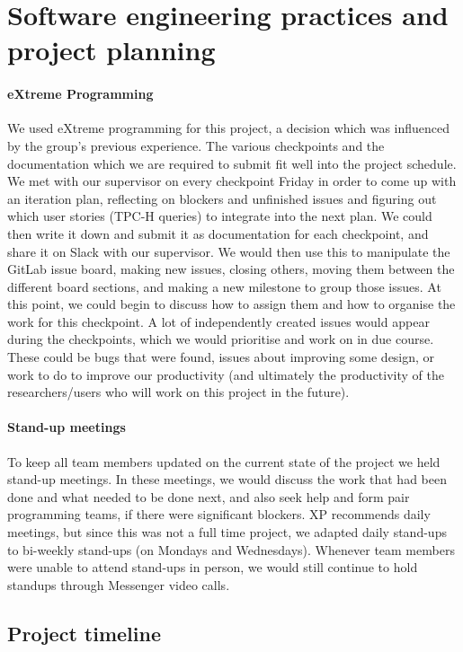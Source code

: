 \newpage
\section{Software engineering practices and project planning}

\paragraph{eXtreme Programming} We used eXtreme programming \cite{XP:2013} for this project, a decision which was influenced by the group's previous experience. The various checkpoints and the documentation which we are required to submit fit well into the project schedule. We met with our supervisor on every checkpoint Friday in order to come up with an iteration plan, reflecting on blockers and unfinished issues and figuring out which user stories (TPC-H queries) to integrate into the next plan. We could then write it down and submit it as documentation for each checkpoint, and share it on Slack with our supervisor. We would then use this to manipulate the GitLab issue board, making new issues, closing others, moving them between the different board sections, and making a new milestone to group those issues. At this point, we could begin to discuss how to assign them and how to organise the work for this checkpoint. A lot of independently created issues would appear during the checkpoints, which we would prioritise and work on in due course. These could be bugs that were found, issues about improving some design, or work to do to improve our productivity (and ultimately the productivity of the researchers/users who will work on this project in the future).

\paragraph{Stand-up meetings} To keep all team members updated on the current state of the project we held stand-up meetings. In these meetings, we would discuss the work that had been done and what needed to be done next, and also seek help and form pair programming teams, if there were significant blockers. XP recommends daily meetings, but since this was not a full time project, we adapted daily stand-ups to bi-weekly stand-ups (on Mondays and Wednesdays). Whenever team members were unable to attend stand-ups in person, we would still continue to hold standups through Messenger video calls.

\subsection{Project timeline}

